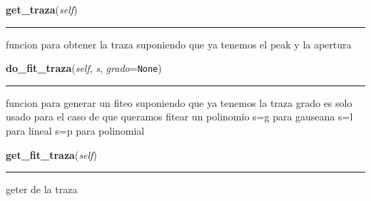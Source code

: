     \label{spectro_metria:spect:get_traza}

    \vspace{0.5ex}

\hspace{.8\funcindent}\begin{boxedminipage}{\funcwidth}

    \raggedright \textbf{get\_traza}(\textit{self})

    \vspace{-1.5ex}

    \rule{\textwidth}{0.5\fboxrule}
\setlength{\parskip}{2ex}
    funcion para obtener la traza suponiendo que ya tenemos el peak y la 
    apertura

\setlength{\parskip}{1ex}
    \end{boxedminipage}

    \label{spectro_metria:spect:do_fit_traza}

    \vspace{0.5ex}

\hspace{.8\funcindent}\begin{boxedminipage}{\funcwidth}

    \raggedright \textbf{do\_fit\_traza}(\textit{self}, \textit{s}, \textit{grado}={\tt None})

    \vspace{-1.5ex}

    \rule{\textwidth}{0.5\fboxrule}
\setlength{\parskip}{2ex}
    funcion para generar un fiteo suponiendo que ya tenemos la traza grado 
    es solo usado para el caso de que queramos fitear un polinomio s=g para
    gauseana s=l para lineal s=p para polinomial

\setlength{\parskip}{1ex}
    \end{boxedminipage}

    \label{spectro_metria:spect:get_fit_traza}

    \vspace{0.5ex}

\hspace{.8\funcindent}\begin{boxedminipage}{\funcwidth}

    \raggedright \textbf{get\_fit\_traza}(\textit{self})

    \vspace{-1.5ex}

    \rule{\textwidth}{0.5\fboxrule}
\setlength{\parskip}{2ex}
    geter de la traza

\setlength{\parskip}{1ex}
    \end{boxedminipage}

